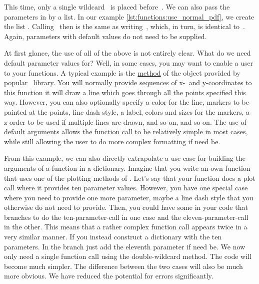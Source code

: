 This time, only a single wildcard~\pythonil{*} is placed before~.
We can also pass the parameters in by  a list.
In our example \cref{lst:functions:use_normal_pdf}, we create the list .
Calling~ then is the same as writing~, which, in turn, is identical to~.
Again, parameters with default values do not need to be supplied.

At first glance, the use of all of the above is not entirely clear.
What do we need default parameter values for?
Well, in some cases, you may want to enable a user to  your functions.
A typical example is the \href{https://matplotlib.org/stable/api/_as_gen/matplotlib.axes.Axes.plot.html}{ method} of the  object provided by popular \matplotlib\ library.
You will normally provide sequences of x-\ and y\nobreakdashes-coordinates to this function it will draw a line which goes through all the points specified this way.
However, you can also optionally specify a color for the line, markers to be painted at the points, line dash style, a label, colors and sizes for the markers, a z\nobreakdashes-order to be used if multiple lines are drawn, and so on, and so on.
The use of default arguments allows the function call to be relatively simple in most cases, while still allowing the user to do more complex formatting if need be.

From this example, we can also directly extrapolate a use case for building the arguments of a function in a dictionary.
Imagine that you write an own function that uses one of the plotting methods of \matplotlib.
Let's say that your function does a plot call where it provides ten parameter values.
However, you have one special case where you need to provide one more parameter, maybe a line dash style that you otherwise do not need to provide.
Then, you could have some  in your code that branches to do the ten-parameter-call in one case and the eleven-parameter-call in the other.
This means that a rather complex function call appears twice in a very similar manner.
If you instead construct a dictionary with the ten parameters.
In the  branch just add the eleventh parameter if need be.
We now only need a single function call using the double-wildcard method.
The code will become much simpler.
The difference between the two cases will also be much more obvious.
We have reduced the potential for errors significantly.

